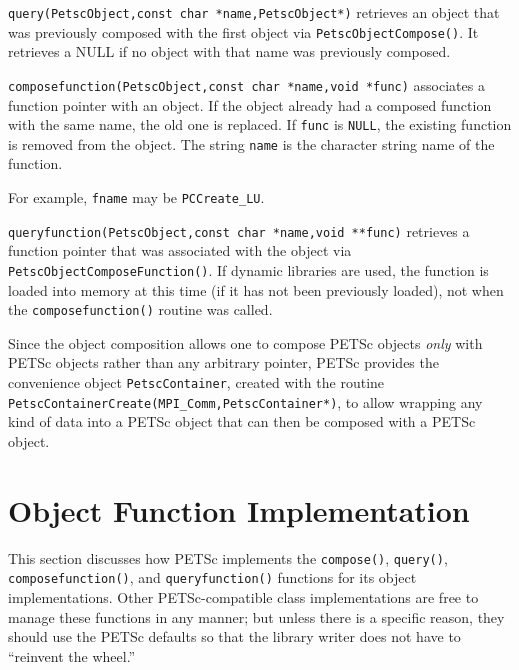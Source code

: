 \begin{tightitemize}
\item \lstinline{query(PetscObject,const char *name,PetscObject*)} retrieves an object that was
      previously composed with the first object via \lstinline{PetscObjectCompose()}. It retrieves a NULL if no object with
      that name was previously composed.

\item \lstinline{composefunction(PetscObject,const char *name,void *func)} associates a function
      pointer with an object. If the object already had a composed function with the
      same name, the old one is replaced. If \lstinline{func} is \lstinline{NULL}, the existing function is removed from
      the object. The string \lstinline{name} is the character string name of the function.

      For example, \lstinline{fname} may be \lstinline{PCCreate_LU}.

\item \lstinline{queryfunction(PetscObject,const char *name,void **func)} retrieves a function pointer that
      was associated with the object via \lstinline{PetscObjectComposeFunction()}. If dynamic libraries are used, the function is loaded
      into memory at this time (if it has not been previously loaded), not when the
      \lstinline{composefunction()} routine was called.

\end{tightitemize}

Since the object composition allows one to compose  PETSc objects {\em only}
with PETSc objects rather than any arbitrary pointer, PETSc provides
the convenience object \lstinline{PetscContainer}, created with the
routine \lstinline{PetscContainerCreate(MPI_Comm,PetscContainer*)},
to allow wrapping any kind of data into a PETSc object that can then be
composed with a PETSc object.

\section{Object Function Implementation}

This section discusses how PETSc implements the \lstinline{compose()}, \lstinline{query()},
\lstinline{composefunction()}, and \lstinline{queryfunction()} functions for its object implementations.
Other PETSc-compatible class implementations are free to manage these functions in any
manner; but unless there is a specific reason, they should use the PETSc defaults so that the library writer does
not have to ``reinvent the wheel.''

